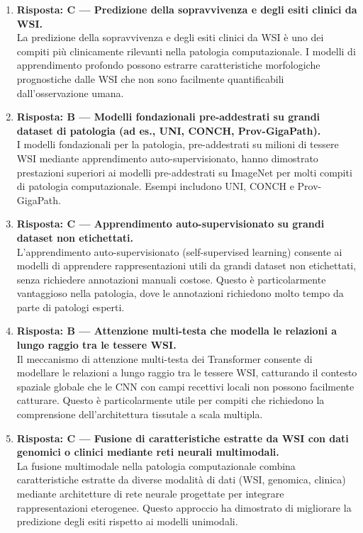 \begin{enumerate}
    \item \textbf{Risposta: C --- Predizione della sopravvivenza e degli esiti clinici da WSI.}\\
    La predizione della sopravvivenza e degli esiti clinici da WSI è uno dei compiti più
    clinicamente rilevanti nella patologia computazionale. I modelli di apprendimento profondo
    possono estrarre caratteristiche morfologiche prognostiche dalle WSI che non sono facilmente
    quantificabili dall'osservazione umana.

    \item \textbf{Risposta: B --- Modelli fondazionali pre-addestrati su grandi dataset di
    patologia (ad es., UNI, CONCH, Prov-GigaPath).}\\
    I modelli fondazionali per la patologia, pre-addestrati su milioni di tessere WSI mediante
    apprendimento auto-supervisionato, hanno dimostrato prestazioni superiori ai modelli
    pre-addestrati su ImageNet per molti compiti di patologia computazionale. Esempi includono
    UNI, CONCH e Prov-GigaPath.

    \item \textbf{Risposta: C --- Apprendimento auto-supervisionato su grandi dataset non
    etichettati.}\\
    L'apprendimento auto-supervisionato (self-supervised learning) consente ai modelli di
    apprendere rappresentazioni utili da grandi dataset non etichettati, senza richiedere
    annotazioni manuali costose. Questo è particolarmente vantaggioso nella patologia, dove le
    annotazioni richiedono molto tempo da parte di patologi esperti.

    \item \textbf{Risposta: B --- Attenzione multi-testa che modella le relazioni a lungo raggio
    tra le tessere WSI.}\\
    Il meccanismo di attenzione multi-testa dei Transformer consente di modellare le relazioni
    a lungo raggio tra le tessere WSI, catturando il contesto spaziale globale che le CNN con
    campi recettivi locali non possono facilmente catturare. Questo è particolarmente utile per
    compiti che richiedono la comprensione dell'architettura tissutale a scala multipla.

    \item \textbf{Risposta: C --- Fusione di caratteristiche estratte da WSI con dati genomici
    o clinici mediante reti neurali multimodali.}\\
    La fusione multimodale nella patologia computazionale combina caratteristiche estratte da
    diverse modalità di dati (WSI, genomica, clinica) mediante architetture di rete neurale
    progettate per integrare rappresentazioni eterogenee. Questo approccio ha dimostrato di
    migliorare la predizione degli esiti rispetto ai modelli unimodali.


\end{enumerate}
